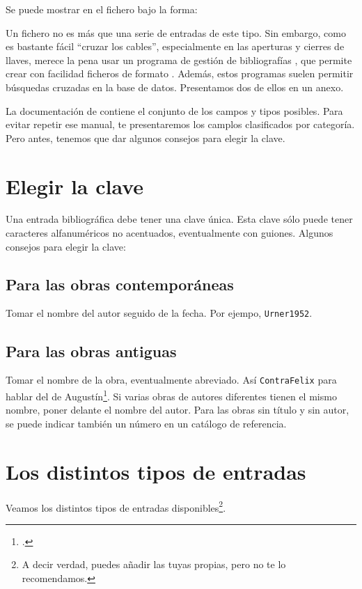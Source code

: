 Se puede mostrar en el fichero  bajo la forma:

\begin{quotation}
\cite{Urner1952}
\end{quotation}


Un fichero  no es más que una serie de entradas de este tipo. Sin embargo, como es bastante fácil \enquote{cruzar los cables}, especialmente en las aperturas y cierres de llaves, merece la pena usar un programa de gestión de bibliografías , que permite crear con facilidad ficheros de formato . Además, estos programas suelen permitir búsquedas cruzadas en la base de datos. Presentamos dos de ellos en un anexo.

La documentación de  contiene el conjunto de los campos y tipos posibles. Para evitar repetir ese manual, te presentaremos los camplos clasificados por categoría. Pero antes, tenemos que dar algunos consejos para elegir la clave.

\section{Elegir la clave}

Una entrada bibliográfica debe tener una clave única. Esta clave sólo puede tener caracteres alfanuméricos no acentuados, eventualmente con guiones.
Algunos consejos para elegir la clave:
\subsection{Para las obras contemporáneas}
Tomar el nombre del autor seguido de la fecha. Por ejempo, \verb|Urner1952|.

\subsection{Para las obras antiguas}

Tomar el nombre de la obra, eventualmente abreviado. Así \verb|ContraFelix| para hablar del  de Augustín\footcite{ContraFelix}. Si varias obras de autores diferentes tienen el mismo nombre, poner delante el nombre del autor. Para las obras sin título  y sin autor, se puede indicar también un número en un catálogo de referencia.



\section{Los distintos tipos de entradas}
Veamos los distintos tipos de entradas disponibles\footnote{A decir verdad, puedes añadir las tuyas propias, pero no te lo recomendamos.}.


